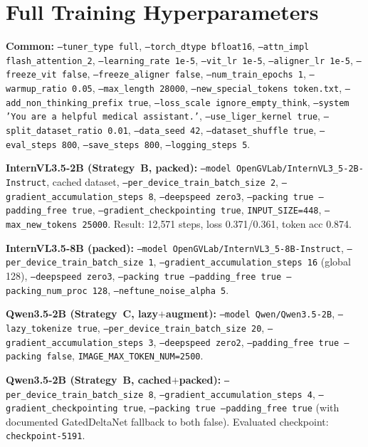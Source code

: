 \documentclass[11pt,a4paper]{article}
\begin{document}
\section{Full Training Hyperparameters}
\label{app:hparams}
\textbf{Common:} \texttt{--tuner\_type full}, \texttt{--torch\_dtype bfloat16}, \texttt{--attn\_impl flash\_attention\_2}, \texttt{--learning\_rate 1e-5}, \texttt{--vit\_lr 1e-5}, \texttt{--aligner\_lr 1e-5}, \texttt{--freeze\_vit false}, \texttt{--freeze\_aligner false}, \texttt{--num\_train\_epochs 1}, \texttt{--warmup\_ratio 0.05}, \texttt{--max\_length 28000}, \texttt{--new\_special\_tokens token.txt}, \texttt{--add\_non\_thinking\_prefix true}, \texttt{--loss\_scale ignore\_empty\_think}, \texttt{--system 'You are a helpful medical assistant.'}, \texttt{--use\_liger\_kernel true}, \texttt{--split\_dataset\_ratio 0.01}, \texttt{--data\_seed 42}, \texttt{--dataset\_shuffle true}, \texttt{--eval\_steps 800}, \texttt{--save\_steps 800}, \texttt{--logging\_steps 5}.

\textbf{InternVL3.5-2B (Strategy~B, packed):} \texttt{--model OpenGVLab/InternVL3\_5-2B-Instruct}, cached dataset, \texttt{--per\_device\_train\_batch\_size 2}, \texttt{--gradient\_accumulation\_steps 8}, \texttt{--deepspeed zero3}, \texttt{--packing true --padding\_free true}, \texttt{--gradient\_checkpointing true}, \texttt{INPUT\_SIZE=448}, \texttt{--max\_new\_tokens 25000}. Result: 12{,}571 steps, loss 0.371/0.361, token acc 0.874.

\textbf{InternVL3.5-8B (packed):} \texttt{--model OpenGVLab/InternVL3\_5-8B-Instruct}, \texttt{--per\_device\_train\_batch\_size 1}, \texttt{--gradient\_accumulation\_steps 16} (global 128), \texttt{--deepspeed zero3}, \texttt{--packing true --padding\_free true --packing\_num\_proc 128}, \texttt{--neftune\_noise\_alpha 5}.

\textbf{Qwen3.5-2B (Strategy~C, lazy$+$augment):} \texttt{--model Qwen/Qwen3.5-2B}, \texttt{--lazy\_tokenize true}, \texttt{--per\_device\_train\_batch\_size 20}, \texttt{--gradient\_accumulation\_steps 3}, \texttt{--deepspeed zero2}, \texttt{--padding\_free true --packing false}, \texttt{IMAGE\_MAX\_TOKEN\_NUM=2500}.

\textbf{Qwen3.5-2B (Strategy~B, cached$+$packed):} \texttt{--per\_device\_train\_batch\_size 8}, \texttt{--gradient\_accumulation\_steps 4}, \texttt{--gradient\_checkpointing true}, \texttt{--packing true --padding\_free true} (with documented GatedDeltaNet fallback to both false). Evaluated checkpoint: \texttt{checkpoint-5191}.
\end{document}
